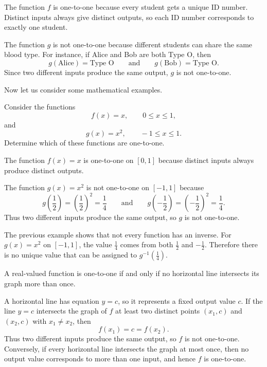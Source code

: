 \begin{solution}
The function \(f\) is one-to-one because every student gets a unique ID number. Distinct inputs always give distinct outputs, so each ID number corresponds to exactly one student.

The function \(g\) is not one-to-one because different students can share the same blood type. For instance, if Alice and Bob are both Type O, then
\[
g(\text{Alice})=\text{Type O}
\qquad \text{and} \qquad
g(\text{Bob})=\text{Type O}.
\]
Since two different inputs produce the same output, \(g\) is not one-to-one.
\end{solution}

Now let us consider some mathematical examples.

\begin{example}
Consider the functions
\[
f(x)=x, \qquad 0\le x\le 1,
\]
and
\[
g(x)=x^2, \qquad -1\le x\le 1.
\]
Determine which of these functions are one-to-one.
\end{example}

\begin{solution}
The function \(f(x)=x\) is one-to-one on \([0,1]\) because distinct inputs always produce distinct outputs.

The function \(g(x)=x^2\) is not one-to-one on \([-1,1]\) because
\[
g\left(\frac12\right)=\left(\frac12\right)^2=\frac14
\qquad \text{and} \qquad
g\left(-\frac12\right)=\left(-\frac12\right)^2=\frac14.
\]
Thus two different inputs produce the same output, so \(g\) is not one-to-one.
\end{solution}

The previous example shows that not every function has an inverse. For \(g(x)=x^2\) on \([-1,1]\), the value \(\frac14\) comes from both \(\frac12\) and \(-\frac12\). Therefore there is no unique value that can be assigned to \(g^{-1}\!\left(\frac14\right)\).

\begin{theorem}
A real-valued function is one-to-one if and only if no horizontal line intersects its graph more than once.
\end{theorem}


A horizontal line has equation $y=c$, so it represents a fixed output value $c$.
If the line $y=c$ intersects the graph of $f$ at least two distinct points $(x_1,c)$ and $(x_2,c)$ with $x_1\neq x_2$, then
\[
f(x_1)=c=f(x_2).
\]
Thus two different inputs produce the same output, so $f$ is not one-to-one.
Conversely, if every horizontal line intersects the graph at most once, then no output value corresponds to more than one input, and hence $f$ is one-to-one.

